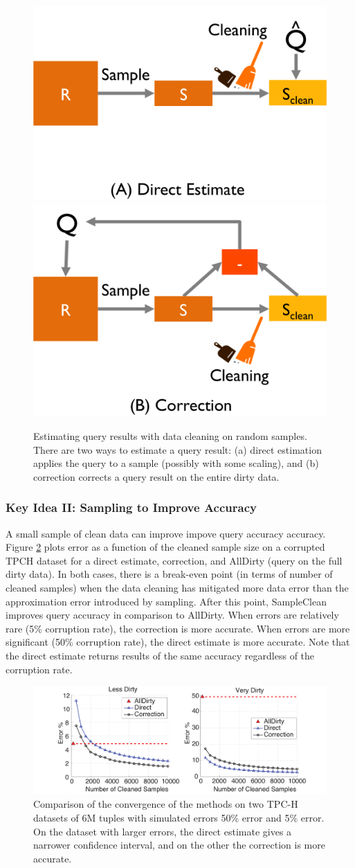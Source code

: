 \begin{figure}\centering
\includegraphics[width=.3\columnwidth]{figs/est1b.png}
\hspace{2em}
\includegraphics[width=.3\columnwidth]{figs/est1c.png}
\caption{Estimating query results with data cleaning on random samples. There are two ways to estimate a query result: (a) direct estimation applies the query to a sample (possibly with some scaling), and (b) correction corrects a query result on the entire dirty data.\label{fig:est}}
\end{figure}

\subsubsection{Key Idea II: Sampling to Improve Accuracy}
A small sample of clean data can improve impove query accuracy accuracy.
Figure \ref{fig:est2} plots error as a function of the cleaned sample size on a corrupted TPCH dataset for a direct estimate, correction, and AllDirty (query on the full dirty data).
In both cases, there is a break-even point (in terms of number of cleaned samples) when the data cleaning has mitigated more data error than the approximation error introduced by sampling.
After this point, SampleClean improves query accuracy in comparison to AllDirty.
When errors are relatively rare (5\% corruption rate), the correction is more accurate. 
When errors are more significant (50\% corruption rate), the direct estimate is more accurate.
Note that the direct estimate returns results of the same accuracy regardless of the corruption rate. 

\begin{figure}
\includegraphics[width=.6\columnwidth]{figs/allerror-samplesize.pdf}
\caption{Comparison of the convergence of the methods on two TPC-H datasets of 6M tuples with simulated errors 50\% error and 5\% error. On the dataset with larger errors, the direct estimate gives a narrower confidence interval, and on the other the correction is more accurate. \label{fig:est2}}
\end{figure}



